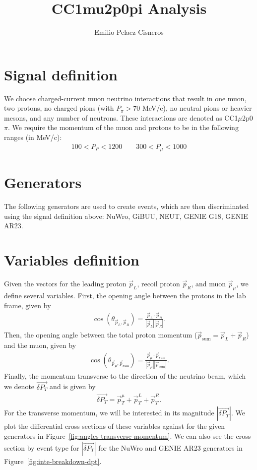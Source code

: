 \documentclass{article}
\title{CC1mu2p0pi Analysis}
\author{Emilio Pelaez Cisneros}
\newcommand{\vm}{\vec{p}_\mu}
\newcommand{\vlp}{\vec{p}_L}
\newcommand{\vrp}{\vec{p}_R}
\newcommand{\vtp}{\vec{p}_{\text{sum}}}
\newcommand{\vdp}{\vec{\delta P_T}}
\begin{document}
\maketitle

\section{Signal definition}

We choose charged-current muon neutrino interactions that result in one muon, two protons, no charged pions (with $P_{\pi} > 70$ MeV/c), no neutral pions or heavier mesons, and any number of neutrons. These interactions are denoted as CC1$\mu$2p0$\pi$. We require the momentum of the muon and protons to be in the following ranges (in MeV/c):
\begin{align}
    100 < P_P < 1200 \qquad 300 < P_\mu < 1000
\end{align}

\section{Generators}

The following generators are used to create events, which are then discriminated using the signal definition above: NuWro, GiBUU, NEUT, GENIE G18, GENIE AR23.

\section{Variables definition}

Given the vectors for the leading proton $\vlp$, recoil proton $\vrp$, and muon $\vm$, we 
define several variables. First, the opening angle between the protons in the lab frame,
given by 
\begin{align}
    \cos\left(\theta_{\vlp,\vrp}\right) = \frac{\vlp \cdot \vrp}{|\vlp||\vrp|}.
\end{align}
Then, the opening angle between the total proton momentum ($\vtp = \vlp + \vrp$) and the 
muon, given by 
\begin{align}
    \cos\left(\theta_{\vm,\vtp}\right) = \frac{\vm \cdot \vtp}{|\vm||\vtp|}.
\end{align}
Finally, the momentum transverse to the direction of the neutrino beam, which we denote $\vdp$ and is given by 
\begin{align}
    \vdp = \vec{p}^{\mu}_T + \vec{p}^{L}_T + \vec{p}^{R}_T.
\end{align}
For the transverse momentum, we will be interested in its magnitude $|\vdp|$. We plot the differential cross sections of these variables against for the given generators in Figure~\ref{fig:angles-transverse-momentum}. We can also see the cross section by event type for $|\vdp|$ for the NuWro and GENIE AR23 generators in Figure~\ref{fig:inte-breakdown-dpt}.
\end{document}
